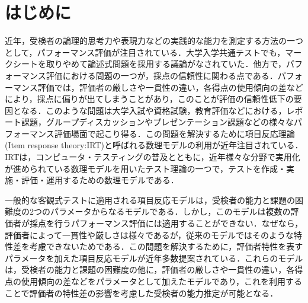 \documentclass[a4paper,11pt,oneside,openany]{jsbook}
\begin{document}
\newpage
\chapter{はじめに}
近年，受検者の論理的思考力や表現力などの実践的な能力を測定する方法の一つとして，パフォーマンス評価が注目されている．大学入学共通テストでも，マークシートを取りやめて論述式問題を採用する議論がなされていた．他方で，パフォーマンス評価における問題の一つが，採点の信頼性に関わる点である．パフォーマンス評価では，評価者の厳しさや一貫性の違い，各得点の使用傾向の差などにより，採点に偏りが出てしまうことがあり，このことが評価の信頼性低下の要因となる．このような問題は大学入試や資格試験，教育評価などにおける，レポート課題，グループディスカッションやプレゼンテーション課題などの様々なパフォーマンス評価場面で起こり得る．この問題を解決するために項目反応理論(Item response theory:IRT)\cite{IRTtext,IRTLord}と呼ばれる数理モデルの利用が近年注目されている．IRTは，コンピュータ・テスティングの普及とともに，近年様々な分野で実用化が進められている数理モデルを用いたテスト理論の一つで，テストを作成・実施・評価・運用するための数理モデルである．

一般的な客観式テストに適用される項目反応モデルは，受検者の能力と課題の困難度の2つのパラメータからなるモデル\cite{rash}である．しかし，このモデルは複数の評価者が採点を行うパフォーマンス評価には適用することができない．なぜなら，評価者によって一貫性や厳しさは様々であるが，従来のモデルではそのような特性差を考慮できないためである．この問題を解決するために，評価者特性を表すパラメータを加えた項目反応モデルが近年多数提案されている\cite{raterRash,rater2,rater3,Patz}．これらのモデルは，受検者の能力と課題の困難度の他に，評価者の厳しさや一貫性の違い，各得点の使用傾向の差などをパラメータとして加えたモデルであり，これを利用することで評価者の特性差の影響を考慮した受検者の能力推定が可能となる．
\end{document}
